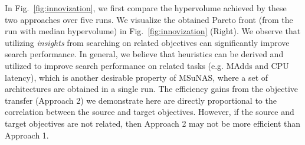 \documentclass[runningheads]{llncs}
\def\ourmethod{MSuNAS}
\begin{document}
In Fig.~\ref{fig:innovization}, we first compare the  hypervolume achieved by these two approaches over five runs. We visualize the obtained Pareto front (from the run with median hypervolume) in Fig.~\ref{fig:innovization} (Right). We observe that utilizing  \emph{insights} from searching on related objectives can significantly improve  search performance. In general, we believe that heuristics can be derived and utilized to improve search performance on related tasks (e.g. MAdds and CPU latency), which is another desirable property of \ourmethod{}, where a set of architectures are obtained in a single run. The efficiency gains from the objective transfer (Approach 2) we demonstrate here are directly proportional to the correlation between the source and target objectives. However, if the source and target objectives are not related, then Approach 2 may not be more efficient than Approach 1.
\end{document}
